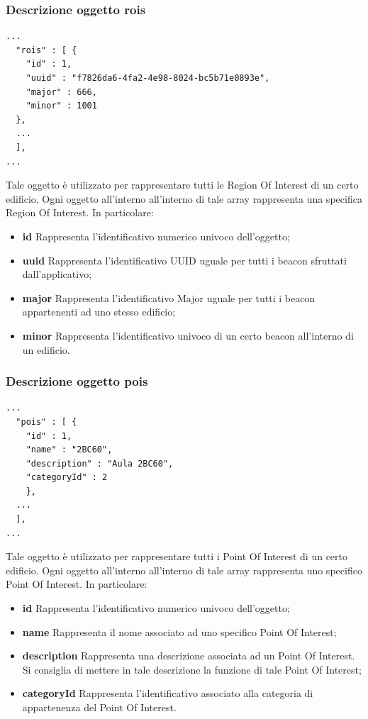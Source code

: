\documentclass[../ManualeSviluppatore.tex]{subfiles}
\begin{document}
	\subsubsection{Descrizione oggetto rois}
		\begin{lstlisting}
...
  "rois" : [ {
    "id" : 1,
    "uuid" : "f7826da6-4fa2-4e98-8024-bc5b71e0893e",
    "major" : 666,
    "minor" : 1001
  },
  ...
  ],
...
		\end{lstlisting}
		Tale oggetto è utilizzato per rappresentare tutti le Region Of Interest di un certo edificio. Ogni oggetto all'interno all'interno di tale array rappresenta una specifica Region Of Interest. In particolare:
		\begin{itemize}
			\item \textbf{id} Rappresenta l'identificativo numerico univoco dell'oggetto;
			\item \textbf{uuid} Rappresenta l'identificativo UUID uguale per tutti i beacon sfruttati dall'applicativo;
			\item \textbf{major} Rappresenta l'identificativo Major uguale per tutti i beacon appartenenti ad uno stesso edificio;
			\item \textbf{minor} Rappresenta l'identificativo univoco di un certo beacon all'interno di un edificio.
		\end{itemize}
		
	\subsubsection{Descrizione oggetto pois}
		\begin{lstlisting}
...
  "pois" : [ {
	"id" : 1,
	"name" : "2BC60",
	"description" : "Aula 2BC60",
	"categoryId" : 2
    }, 
  ...
  ],
...
		\end{lstlisting}
		Tale oggetto è utilizzato per rappresentare tutti i Point Of Interest di un certo edificio. Ogni oggetto all'interno all'interno di tale array rappresenta uno specifico Point Of Interest. In particolare:
		\begin{itemize}
			\item \textbf{id} Rappresenta l'identificativo numerico univoco dell'oggetto;
			\item \textbf{name} Rappresenta il nome associato ad uno specifico Point Of Interest;
			\item \textbf{description} Rappresenta una descrizione associata ad un Point Of Interest. Si consiglia di mettere in tale descrizione la funzione di tale Point Of Interest;
			\item \textbf{categoryId} Rappresenta l'identificativo associato alla categoria di appartenenza del Point Of Interest.
		\end{itemize}
		
\end{document}
